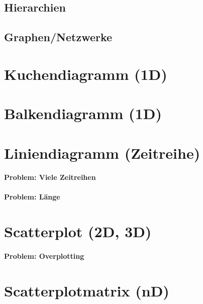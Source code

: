 \documentclass[a4paper, 11pt, accentcolor = tud3b]{tudreport}
\begin{document}
			\subsection{Hierarchien} %

			\subsection{Graphen/Netzwerke} %

		\section{Kuchendiagramm (1D)} %

		\section{Balkendiagramm (1D)} %

		\section{Liniendiagramm (Zeitreihe)} %

			\paragraph{Problem: Viele Zeitreihen} %

			\paragraph{Problem: Länge} %

		\section{Scatterplot (2D, 3D)} %

			\paragraph{Problem: Overplotting} %

		\section{Scatterplotmatrix (nD)} %
\end{document}
